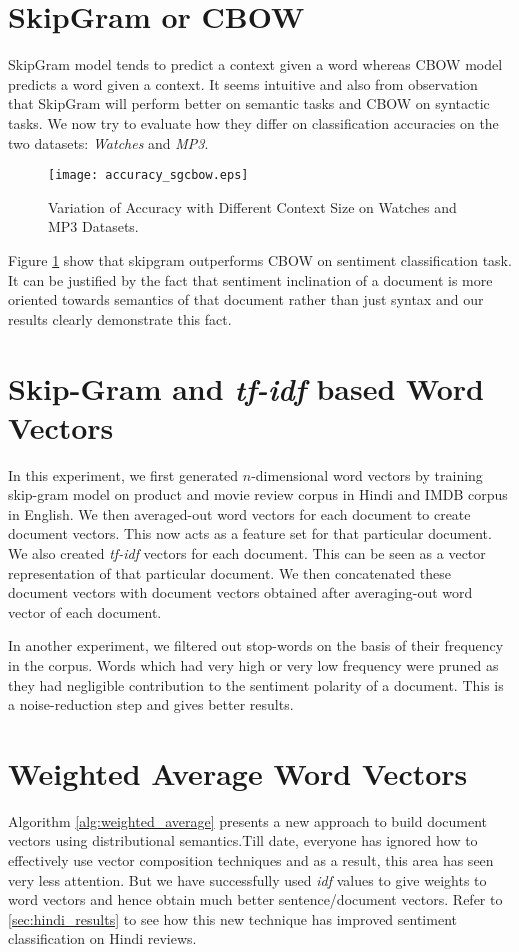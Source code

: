 \section{SkipGram or CBOW}
SkipGram model tends to predict a context given a word whereas CBOW model predicts a word given a context. It seems intuitive and also from observation~\cite{Mikolov:13b} that SkipGram will perform better on semantic tasks and CBOW on syntactic tasks. We now try to evaluate how they differ on classification accuracies on the two datasets: \emph{Watches} and \emph{MP3}.
\begin{figure}[ht!]
\centering
\texttt{[image: accuracy\_sgcbow.eps]}
\caption{Variation of Accuracy with Different Context Size on Watches and MP3 Datasets. \label{fig:accuracy_sgcbow}}
\end{figure}
Figure \ref{fig:accuracy_sgcbow} show that skipgram outperforms CBOW on sentiment classification task. It can be justified by the fact that sentiment inclination of a document is more oriented towards semantics of that document rather than just syntax and our results clearly demonstrate this fact.

\section{Skip-Gram and \emph{tf-idf} based Word Vectors}
In this experiment, we first generated $n$-dimensional word vectors by training skip-gram model on product and movie review corpus in Hindi and IMDB corpus in English. We then averaged-out word vectors for each document to create document vectors. This now acts as a feature set for that particular document.
We also created \emph{tf-idf} vectors for each document. This can be seen as a vector representation of that particular document. We then concatenated these document vectors with document vectors obtained after averaging-out word vector of each document.

In another experiment, we filtered out stop-words on the basis of their frequency in the corpus. Words which had very high or very low frequency were pruned as they had negligible contribution to the sentiment polarity of a document. This is a noise-reduction step and gives better results.

\section{Weighted Average Word Vectors}
Algorithm \ref{alg:weighted_average} presents a new approach to build document vectors using distributional semantics.Till date, everyone has ignored how to effectively use vector composition techniques and as a result, this area has seen very less attention. But we have successfully used \emph{idf} values to give weights to word vectors and hence obtain much better sentence/document vectors. Refer to \ref{sec:hindi_results} to see how this new technique has improved sentiment classification on Hindi reviews.\\

